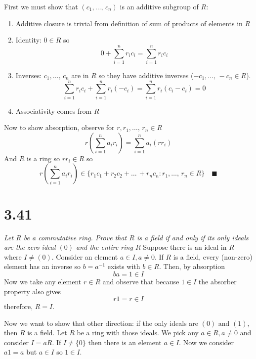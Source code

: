 \documentclass[12pt]{article}
\newcommand{\qed}{\quad \blacksquare}
\begin{document}
\begin{enumerate}[label=(\alph*)]
            \color{blue}
                First we must show that $(c_1, \dots,\, c_n)$ is an additive subgroup of $R$:
                \begin{enumerate}
                    \item Additive closure is trivial from definition of sum of products of elements in $R$ 
                    \item Identity: $0 \in R$ so  
                    \[0 + \sum^n_{i=1} r_i c_i = \sum^n_{i=1} r_i c_i\] 
                    \item Inverses: $c_1, \dots,\, c_n$ are in $R$ so they have additive inverses ($-c_1, \dots,\, -c_n \in R$).
                    \[\sum_{i=1}^n r_ic_i + \sum_{i=1}^n r_i(-c_i) = \sum_{i=1}^n r_i(c_i - c_i) = 0\]
                    \item Associativity comes from $R$
                \end{enumerate}

                Now to show absorption, observe for $r, r_1, \dots,\, r_n \in R$
                \[r(\sum_{i=1}^n a_i r_i) = \sum_{i=1}^n a_i (rr_i)\]
                And $R$ is a ring so $rr_i \in R$ so 
                \[r(\sum_{i=1}^n a_i r_i) \in \{r_1c_1 + r_2c_2 + \dots\, + r_nc_n : r_1, \dots,\, r_n \in R\} \qed\]
            \color{black}
    \end{enumerate}
\pagebreak

\section*{3.41}
    \emph{Let $R$ be a commutative ring. Prove that $R$ is a field if and only if its only ideals are the zero ideal $(0)$ and the entire ring $R$}
        \color{blue}
            Suppose there is an ideal in $R$ where $I \neq (0)$. Consider an element $a \in I, a \neq 0$. If $R$ is a field, every (non-zero) element has an inverse so $b = a^{-1}$ exists with $b \in R$. Then, by absorption 
            \[ba = 1 \in I\]
            Now we take any element $r \in R$ and observe that because $1 \in I$ the absorber property also gives 
            \[r1 = r \in I\]
            therefore, $R = I$. 

            Now we want to show that other direction: if the only ideals are $(0)$ and $(1)$, then $R$ is a field. Let $R$ be a ring with those ideals. We pick any $a \in R, a \neq 0$ and consider $I = aR$. If $I \neq \{0\}$ then there is an element $a \in I$. Now we consider $a1 = a$ but $a \in I$ so $1 \in I$.
            
\end{document}
